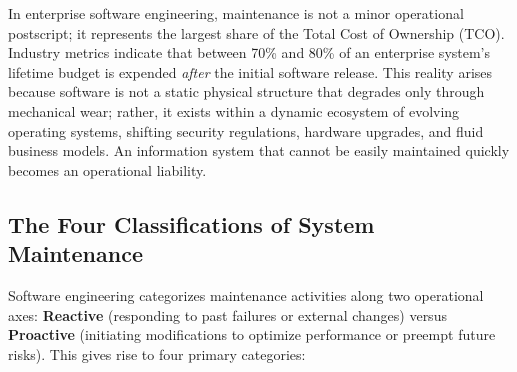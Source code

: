 \documentclass[11pt,a4paper]{article}
\begin{document}
In enterprise software engineering, maintenance is not a minor operational postscript; it represents the largest share of the Total Cost of Ownership (TCO). Industry metrics indicate that between 70\% and 80\% of an enterprise system's lifetime budget is expended \textit{after} the initial software release. This reality arises because software is not a static physical structure that degrades only through mechanical wear; rather, it exists within a dynamic ecosystem of evolving operating systems, shifting security regulations, hardware upgrades, and fluid business models. An information system that cannot be easily maintained quickly becomes an operational liability.

\subsection{The Four Classifications of System Maintenance}
Software engineering categorizes maintenance activities along two operational axes: \textbf{Reactive} (responding to past failures or external changes) versus \textbf{Proactive} (initiating modifications to optimize performance or preempt future risks). This gives rise to four primary categories:
\end{document}
